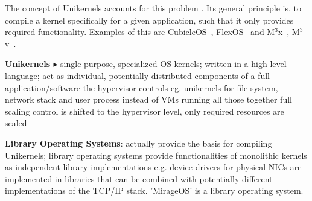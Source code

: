 The concept of Unikernels accounts for this problem \cite{madhavapeddy2014unikernels}. Its general principle is, to compile a kernel specifically for a given application, such that it only provides required functionality. 
Examples of this are CubicleOS~\cite{sartakov2021cubicleos}, FlexOS~\cite{lefeuvre2021flexos} and M$^3$x~\cite{Asmussen:M3x}, M$^3$v~\cite{Asmussen:M3v}.

\textbf{Unikernels\cite{madhavapeddy2014unikernels} $\blacktriangleright$} single purpose, specialized OS kernels; written in a high-level language; act as individual, potentially distributed components of a full application/software \means the hypervisor controls eg. unikernels for file system, network stack and user process instead of VMs running all those together \means full scaling control is shifted to the hypervisor level, only required resources are scaled

\textbf{Library Operating Systems}: actually provide the basis for compiling Unikernels; library operating systems provide functionalities of monolithic kernels as independent library implementations e.g. device drivers for physical NICs are implemented in libraries that can be combined with potentially different implementations of the TCP/IP stack. 'MirageOS' is a library operating system.

